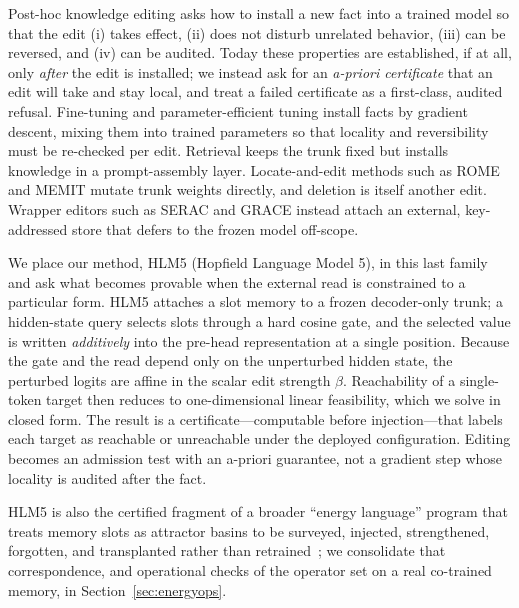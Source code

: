 \documentclass[11pt]{article}
\theoremstyle{remark}
\begin{document}
Post-hoc knowledge editing asks how to install a new fact into a trained model so
that the edit (i) takes effect, (ii) does not disturb unrelated behavior, (iii)
can be reversed, and (iv) can be audited. Today these properties are
established, if at all, only \emph{after} the edit is installed; we
instead ask for an \emph{a-priori certificate} that an edit will take and stay local,
and treat a failed certificate as a first-class, audited refusal. Fine-tuning and parameter-efficient
tuning install facts by gradient descent, mixing them into trained parameters so
that locality and reversibility must be re-checked per
edit. Retrieval keeps the trunk fixed but installs knowledge in a prompt-assembly
layer. Locate-and-edit methods such as ROME and MEMIT \citep{meng2022rome,
meng2022memit} mutate trunk weights directly, and deletion is itself another
edit. Wrapper editors such as SERAC and GRACE \citep{mitchell2022serac,
hartvigsen2023grace} instead attach an external, key-addressed store that defers
to the frozen model off-scope.

We place our method, HLM5 (Hopfield Language Model 5), in this last family and ask what becomes provable when
the external read is constrained to a particular form. HLM5 attaches a slot memory
to a frozen decoder-only trunk; a hidden-state query selects slots through a hard
cosine gate, and the selected value is written \emph{additively} into the
pre-head representation at a single position. Because the gate and the read depend
only on the unperturbed hidden state, the perturbed logits are affine in the
scalar edit strength $\beta$. Reachability of a single-token target then reduces
to one-dimensional linear feasibility, which we solve in closed form. The result
is a certificate---computable before injection---that labels each target as
reachable or unreachable under the deployed configuration. Editing becomes an
admission test with an a-priori guarantee, not a gradient step whose locality is
audited after the fact.

HLM5 is also the certified fragment of a broader ``energy language'' program that
treats memory slots as attractor basins to be surveyed, injected, strengthened,
forgotten, and transplanted rather than retrained~\citep{qriton2026energylang,
qriton2026hlm}; we consolidate that correspondence, and operational checks of the
operator set on a real co-trained memory, in Section~\ref{sec:energyops}.
\end{document}
